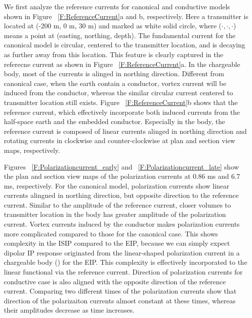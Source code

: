 \documentclass[extra,mreferee]{gji}
\begin{document}
We first analyze the reference currents for canonical and conductive models shown in Figure ~\ref{F:ReferenceCurrent}a and b, respectively. 
Here a transmitter is located at (-200 m, 0 m, 30 m) and marked as white solid circle, where ($\cdot, \cdot, \cdot$) means a point at (easting, northing, depth).  
The fundamental current for the canonical model is circular, centered to the transmitter location, and is decaying as further away from this location. This feature is clearly captured in the referecne current as shown in Figure ~\ref{F:ReferenceCurrent}a. 
In the chargeable body, most of the currents is alinged in northing direction. 
Different from canonical case, when the earth contain a conductor, vortex current will be induced from the conductor, whereas the similar circular current centered to transmitter location still exists.  
Figure ~\ref{F:ReferenceCurrent}b shows that the reference current, which effectively incorporate both induced currents from the half-space earth and the embedded conductor.  
Especially in the body, the reference current is composed of linear currents alinged in northing direction and rotating currents in clockwise and counter-clockwise at plan and section view maps, respectively. 

Figures ~\ref{F:Polarizationcurrent_early} and ~\ref{F:Polarizationcurrent_late} show the plan and section view maps of the polarization currents at 0.86 ms and 6.7 ms, respectively. 
For the canonical model, polarization currents show linear currents alingned in northing direction, but opposite direction to the reference current. 
Similar to the amplitude of the reference current, closer volumes to transmitter location in the body has greater amplitude of the polarization current. 
Vortex currents induced by the conductor makes polarization currents more complicated compared to those for the canonical case. 
This shows complexity in the ISIP compared to the EIP, because we can simply expect dipolar IP response originated from the linear-shaped polarization current in a chargeable body (\cite{seigel1959}) for the EIP.
This complexity is effectively incorporated to the linear functional via the reference current. 
Direction of polarization currents for conductive case is also aligned with the opposite direction of the reference current.
Comparing two different times of the polarization currents show that direction of the polarizaiton currents almost constant at these times, whereas their amplitudes decrease as time increases. 
\end{document}
